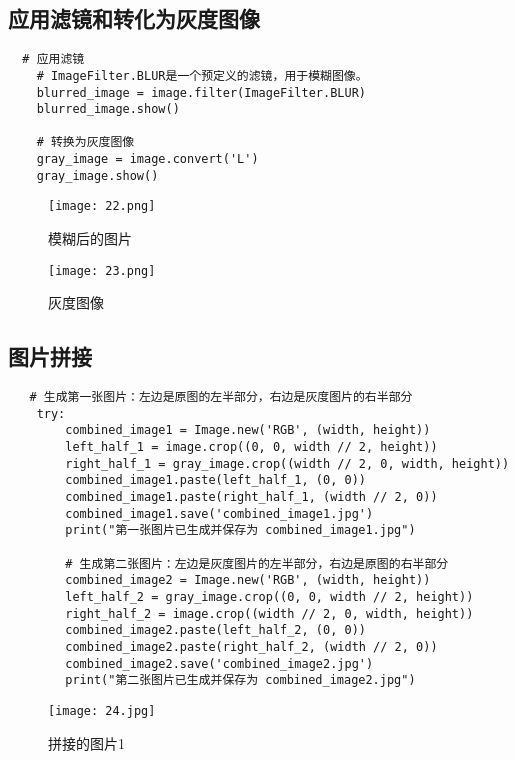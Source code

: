 \documentclass[a4paper, 12pt]{article}
\begin{document}
\subsection{应用滤镜和转化为灰度图像}

\begin{verbatim}
  # 应用滤镜
    # ImageFilter.BLUR是一个预定义的滤镜，用于模糊图像。
    blurred_image = image.filter(ImageFilter.BLUR)
    blurred_image.show()

    # 转换为灰度图像
    gray_image = image.convert('L')
    gray_image.show()
  \end{verbatim}
  
 \begin{figure}[H]
  \centering
    \texttt{[image: 22.png]}
  \caption{模糊后的图片}
   \end{figure}  
   
    \begin{figure}[H]
  \centering
    \texttt{[image: 23.png]}
  \caption{灰度图像}
   \end{figure}  
   
\subsection{图片拼接}

\begin{verbatim}
   # 生成第一张图片：左边是原图的左半部分，右边是灰度图片的右半部分
    try:
        combined_image1 = Image.new('RGB', (width, height))
        left_half_1 = image.crop((0, 0, width // 2, height))
        right_half_1 = gray_image.crop((width // 2, 0, width, height))
        combined_image1.paste(left_half_1, (0, 0))
        combined_image1.paste(right_half_1, (width // 2, 0))
        combined_image1.save('combined_image1.jpg')
        print("第一张图片已生成并保存为 combined_image1.jpg")

        # 生成第二张图片：左边是灰度图片的左半部分，右边是原图的右半部分
        combined_image2 = Image.new('RGB', (width, height))
        left_half_2 = gray_image.crop((0, 0, width // 2, height))
        right_half_2 = image.crop((width // 2, 0, width, height))
        combined_image2.paste(left_half_2, (0, 0))
        combined_image2.paste(right_half_2, (width // 2, 0))
        combined_image2.save('combined_image2.jpg')
        print("第二张图片已生成并保存为 combined_image2.jpg")
  \end{verbatim}
   
 \begin{figure}[H]
  \centering
    \texttt{[image: 24.jpg]}
  \caption{拼接的图片1}
   \end{figure}  
   
\end{document}
